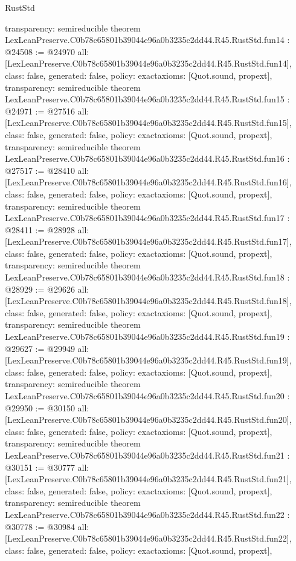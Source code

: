 \begin{lexlean}{RustStd}
\begin{coremodule}
{  transparency: semireducible
}
theorem LexLeanPreserve.C0b78c65801b39044e96a0b3235c2dd44.R45.RustStd.fun14 : @24508 := @24970 {
  all: [LexLeanPreserve.C0b78c65801b39044e96a0b3235c2dd44.R45.RustStd.fun14],
  class: false,
  generated: false,
  policy: exact{axioms: [Quot.sound, propext]},
  transparency: semireducible
}
theorem LexLeanPreserve.C0b78c65801b39044e96a0b3235c2dd44.R45.RustStd.fun15 : @24971 := @27516 {
  all: [LexLeanPreserve.C0b78c65801b39044e96a0b3235c2dd44.R45.RustStd.fun15],
  class: false,
  generated: false,
  policy: exact{axioms: [Quot.sound, propext]},
  transparency: semireducible
}
theorem LexLeanPreserve.C0b78c65801b39044e96a0b3235c2dd44.R45.RustStd.fun16 : @27517 := @28410 {
  all: [LexLeanPreserve.C0b78c65801b39044e96a0b3235c2dd44.R45.RustStd.fun16],
  class: false,
  generated: false,
  policy: exact{axioms: [Quot.sound, propext]},
  transparency: semireducible
}
theorem LexLeanPreserve.C0b78c65801b39044e96a0b3235c2dd44.R45.RustStd.fun17 : @28411 := @28928 {
  all: [LexLeanPreserve.C0b78c65801b39044e96a0b3235c2dd44.R45.RustStd.fun17],
  class: false,
  generated: false,
  policy: exact{axioms: [Quot.sound, propext]},
  transparency: semireducible
}
theorem LexLeanPreserve.C0b78c65801b39044e96a0b3235c2dd44.R45.RustStd.fun18 : @28929 := @29626 {
  all: [LexLeanPreserve.C0b78c65801b39044e96a0b3235c2dd44.R45.RustStd.fun18],
  class: false,
  generated: false,
  policy: exact{axioms: [Quot.sound, propext]},
  transparency: semireducible
}
theorem LexLeanPreserve.C0b78c65801b39044e96a0b3235c2dd44.R45.RustStd.fun19 : @29627 := @29949 {
  all: [LexLeanPreserve.C0b78c65801b39044e96a0b3235c2dd44.R45.RustStd.fun19],
  class: false,
  generated: false,
  policy: exact{axioms: [Quot.sound, propext]},
  transparency: semireducible
}
theorem LexLeanPreserve.C0b78c65801b39044e96a0b3235c2dd44.R45.RustStd.fun20 : @29950 := @30150 {
  all: [LexLeanPreserve.C0b78c65801b39044e96a0b3235c2dd44.R45.RustStd.fun20],
  class: false,
  generated: false,
  policy: exact{axioms: [Quot.sound, propext]},
  transparency: semireducible
}
theorem LexLeanPreserve.C0b78c65801b39044e96a0b3235c2dd44.R45.RustStd.fun21 : @30151 := @30777 {
  all: [LexLeanPreserve.C0b78c65801b39044e96a0b3235c2dd44.R45.RustStd.fun21],
  class: false,
  generated: false,
  policy: exact{axioms: [Quot.sound, propext]},
  transparency: semireducible
}
theorem LexLeanPreserve.C0b78c65801b39044e96a0b3235c2dd44.R45.RustStd.fun22 : @30778 := @30984 {
  all: [LexLeanPreserve.C0b78c65801b39044e96a0b3235c2dd44.R45.RustStd.fun22],
  class: false,
  generated: false,
  policy: exact{axioms: [Quot.sound, propext]},
}
\end{coremodule}
\end{lexlean}
